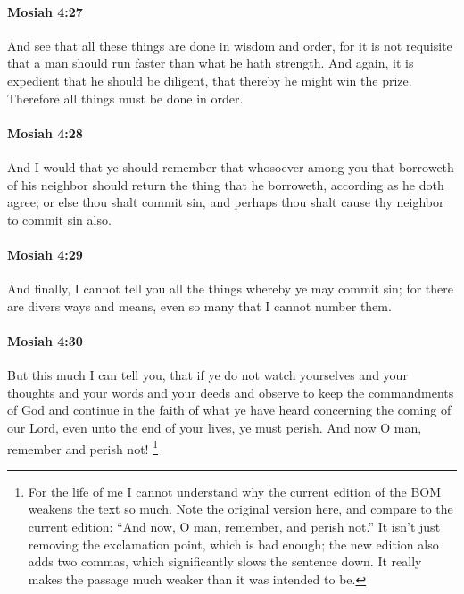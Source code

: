 		\paragraph{Mosiah 4:27} %
			\label{MOSIAH-4-27}

			And see that all these things are done in wisdom and order,
			for it is not requisite that a man should run faster than what he hath strength.
			And again, it is expedient that he should be diligent,
			that thereby he might win the prize.
			Therefore all things must be done in order.

		\paragraph{Mosiah 4:28} %
			\label{MOSIAH-4-28}

			And I would that ye should remember
			that whosoever among you that borroweth of his neighbor
			should return the thing that he borroweth,
			according as he doth agree;
			or else thou shalt commit sin,
			and perhaps thou shalt cause thy neighbor to commit sin also.

		\paragraph{Mosiah 4:29} %
			\label{MOSIAH-4-29}

			And finally, I cannot tell you all the things whereby ye may commit sin;
			for there are divers ways and means,
			even so many that I cannot number them.

		\paragraph{Mosiah 4:30} %
			\label{MOSIAH-4-30}

			But this much I can tell you,
			that if ye do not watch yourselves
			and your thoughts and your words and your deeds
			and observe to keep the commandments of God
			and continue in the faith of what ye have heard
			concerning the coming of our Lord,
			even unto the end of your lives,
			ye must perish.
			And now O man, remember and perish not!%
				\footnote{%
					\label{MOSIAH-4-30-NOTE-exclamation}%
					For the life of me I cannot understand why the current edition of the BOM weakens the text so much. Note the original version here, and compare to the current edition: ``And now, O man, remember, and perish not.'' It isn't just removing the exclamation point, which is bad enough; the new edition also adds two commas, which significantly slows the sentence down. It really makes the passage much weaker than it was intended to be.
					}
					
